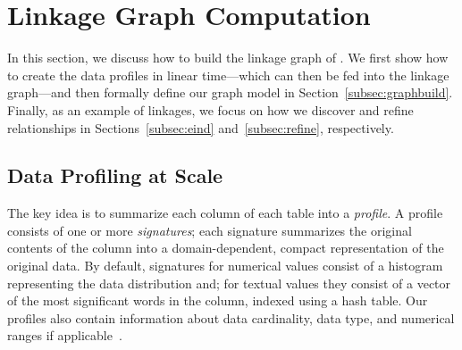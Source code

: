 \section{Linkage Graph Computation}
\label{sec:stitching}

In this section, we discuss how to build the linkage graph of \dcv. We first
show how to create the data profiles in linear time---which can then be fed into
the linkage graph---and then formally define our graph model in
Section~\ref{subsec:graphbuild}. Finally, as an example of linkages, we focus on
how we discover and refine \pkfk relationships in Sections~\ref{subsec:eind}
and~\ref{subsec:refine}, respectively.



\subsection{Data Profiling at Scale}\label{subsec:profile}

The key idea is to summarize each column of each table into a {\em profile}.
A profile consists of one or more {\it signatures};  each signature summarizes
the original contents of the column into a domain-dependent, compact
representation of the original data.  By default, signatures for numerical values consist of a
histogram representing the data distribution and; for textual values they consist of a vector
of the most significant words in the column, indexed using a hash table.  Our profiles also
contain information about data cardinality, data type, and numerical ranges if
applicable~\cite{profiling_survey}. 


